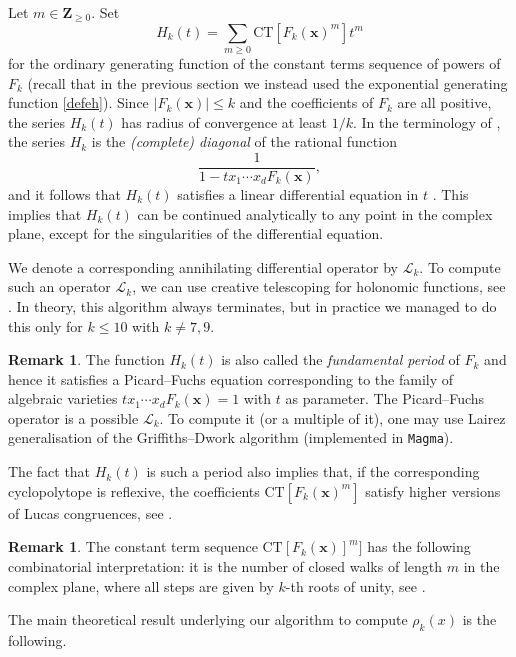 \documentclass[12pt,reqno]{amsart}
\theoremstyle{definition}
\theoremstyle{plain}
\theoremstyle{definition}
\newtheorem{remark}[theorem]{Remark}
\newcommand{\Z}{\mathbf{Z}}
\renewcommand{\geq}{\geqslant}
\renewcommand{\leq}{\leqslant}
\begin{document}
Let $m \in \Z_{\geq 0}$. Set
\[
H_k(t) = \sum_{m \geq 0} \mathrm{CT}[F_k(\mathbf{x})^m] t^m
\]
for the ordinary generating function of the constant terms sequence of powers of $F_k$ (recall that in the previous section we instead used the exponential generating function \eqref{defeh}). Since $|F_k(\mathbf{x})| \leq k$ and the coefficients of $F_k$ are all positive, the series $H_k(t)$ has radius of convergence at least $1/k$. In the terminology of \cite{Lipshitz}, the series $H_k$ is the \emph{(complete) diagonal} of the rational function 
\[
\frac{1}{1-t x_1 \cdots x_{d} F_k(\mathbf{x})},
\]
and it follows that $H_k(t)$ satisfies a linear differential equation in $t$ \cite[Theorem~1]{Lipshitz}. This implies that $H_k(t)$ can be continued analytically to any point in the complex plane, except for the singularities of the differential equation.

We denote a corresponding annihilating differential operator by $\mathcal{L}_k$. 
To compute such an operator $\mathcal L_k$, we can use creative telescoping for holonomic functions, see \cite{Koutschan}. In theory, this algorithm always terminates, but in practice we managed to do this only for $k \leq 10$ with $k \neq 7,9$.


\begin{remark} \label{remPF} 
The function $H_k(t)$ is also called the \emph{fundamental period} of $F_k$ and hence it satisfies a Picard--Fuchs equation \cite{Christol} corresponding to the family of algebraic varieties $t x_1 \cdots x_{d} F_k(\mathbf{x})=1$ with $t$ as parameter. The Picard--Fuchs operator is a possible $
\mathcal L_k$. To compute it (or a multiple of it), one may use Lairez generalisation of the Griffiths--Dwork algorithm \cite{Lairez} (implemented in \texttt{Magma}). 

The fact that $H_k(t)$ is such a period also implies that, if the corresponding cyclopolytope is reflexive, the coefficients $\mathrm{CT}[F_k(\mathbf{x})^m]$ satisfy higher versions of Lucas congruences, see \cite[Theorem 3.3]{SamolvStraten}.
\end{remark} 

\begin{remark} 
The constant term sequence $\text{CT}[F_k(\mathbf x)]^m]$ has the following combinatorial interpretation: it is the number of closed walks of length $m$ in the complex plane, where all steps are given by $k$-th roots of unity, see \cite[Thm.\ 2.2]{Lala}. 
\end{remark}

The main theoretical result underlying our algorithm to compute $\rho_k(x)$ is the following.
\end{document}
